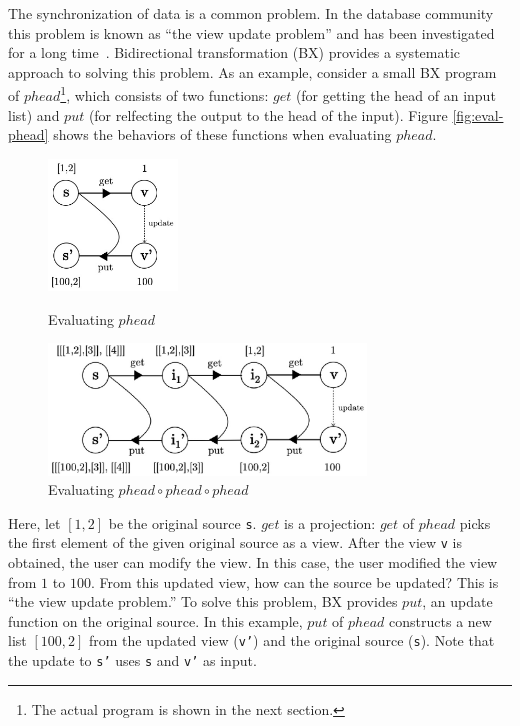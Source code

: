The synchronization of data is a common problem. In the database community this problem is known as “the view update problem” and has been investigated for a long time~\cite{Bancilhon:1981:USR:319628.319634}. Bidirectional transformation (BX) provides a systematic approach to solving this problem.
As an example, consider a small BX program of $phead$\footnote{The actual program is shown in the next section.}, which consists of two functions: $get$ (for getting the head of an input list) and $put$ (for relfecting the output to the head of the input). Figure \ref{fig:eval-phead} shows the behaviors of these functions when evaluating $phead$.

\begin{figure}[!t]
  \begin{minipage}{0.3\textwidth}
    \centering
    \includegraphics[height=3.5cm]{./fig/fig1.eps}
    \caption{Evaluating $phead$}
    \label{fig:eval-phead}
  \end{minipage}\hfill
  \begin{minipage}{0.7\textwidth}
    \centering
    \includegraphics[height=3.5cm]{./fig/fig2.eps}
    \caption{Evaluating $phead \circ phead \circ phead$}
    \label{fig:eval-comp-phead}
  \end{minipage}
\end{figure}

Here, let $[1,2]$ be the original source \texttt{s}.
$get$ is a projection: $get$ of $phead$ picks the first element of the given original source as a view.
After the view \texttt{v} is obtained, the user can modify the view.
In this case, the user
modified the view
from $1$ to $100$.
From this updated view, how can the source be updated?
This is ``the view update problem.''
To solve this problem, BX provides $put$, an update function on the original source.
In this example, $put$ of $phead$ constructs a new list ${[100,2]}$ from the updated view (\texttt{v'}) and the original source (\texttt{s}).
Note that the update to \texttt{s'} uses \texttt{s} and \texttt{v'} as input.

